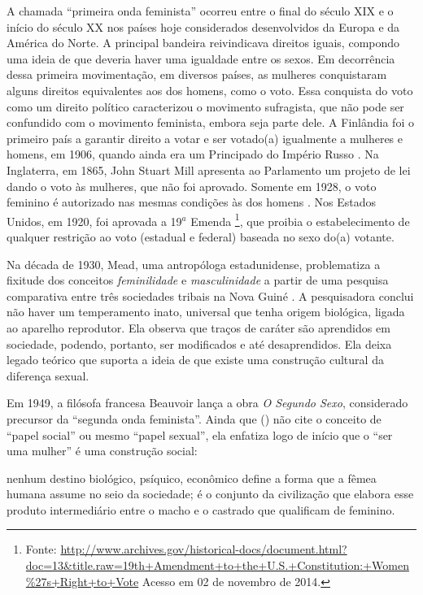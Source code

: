 A chamada ``primeira onda feminista'' ocorreu entre o final do século XIX e o início do século XX nos países hoje considerados desenvolvidos da Europa e da América do Norte. A principal bandeira reivindicava direitos iguais, compondo uma ideia de que deveria haver uma igualdade entre os sexos. Em decorrência dessa primeira movimentação, em diversos países, as mulheres conquistaram alguns direitos equivalentes aos dos homens, como o voto. Essa conquista do voto como um direito político caracterizou o movimento sufragista, que não pode ser confundido com o movimento feminista, embora seja parte dele.
A Finlândia foi o primeiro país a garantir direito a votar e ser votado(a) igualmente a mulheres e homens, em 1906, quando ainda era um Principado do Império Russo \cite{RAY1918}.
Na Inglaterra, em 1865, John Stuart Mill apresenta ao Parlamento um projeto de lei dando o voto às mulheres, que não foi aprovado. Somente em 1928, o voto feminino é autorizado nas mesmas condições às dos homens \cite{NELSON2004}.
Nos Estados Unidos, em 1920, foi aprovada a 19$^a$ Emenda%
\footnote{Fonte: \url{http://www.archives.gov/historical-docs/document.html?doc=13&title.raw=19th+Amendment+to+the+U.S.+Constitution:+Women\%27s+Right+to+Vote} Acesso em 02 de novembro de 2014.}, que proibia o estabelecimento de qualquer restrição ao voto (estadual e federal) baseada no sexo do(a) votante. 
 
Na década de 1930, Mead, uma antropóloga estadunidense, problematiza a fixitude dos conceitos \emph{feminilidade} e \emph{masculinidade} a partir de uma pesquisa comparativa entre três sociedades tribais na Nova Guiné  \cite{MEAD2000}. A pesquisadora conclui não haver um temperamento inato, universal que tenha origem biológica, ligada ao aparelho reprodutor. Ela observa que traços de caráter são aprendidos em sociedade, podendo, portanto, ser modificados e até desaprendidos. Ela deixa legado teórico que suporta a ideia de que existe uma construção cultural da diferença sexual.

Em 1949, a filósofa francesa Beauvoir lança a obra \emph{O Segundo Sexo}, considerado precursor da ``segunda onda feminista''\cite{PISCITELLI2009}. Ainda que  (\citeyear{BEAUVOIR1967}) não cite o conceito de  ``papel social'' ou mesmo ``papel sexual'', ela enfatiza logo de início que o ``ser uma mulher'' é uma construção social:

\begin{citacao}
nenhum destino biológico, psíquico, econômico define a forma que a fêmea humana assume no seio da sociedade; é o conjunto da civilização que elabora esse produto intermediário entre o macho e o castrado que qualificam de feminino.
\cite[p.09]{BEAUVOIR1967}
\end{citacao}

